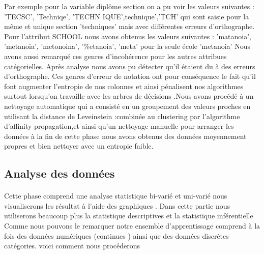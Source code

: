 Par exemple pour la variable diplôme section on a pu voir les valeurs suivantes : 'TECSC', 'Techniqe',
'TECHN IQUE',technique','TCH' qui sont saisie pour la même et unique
section 'techniques' mais avec différentes erreurs d'orthographe. \\
Pour l'attribut SCHOOL nous avons obtenus les valeurs suivantes :
'matanoia', 'metanoia', 'metonoina', '\%etanoia', 'meta' pour la seule école 'metanoia'
Nous avons aussi remarqué ces genres d'incohérence pour les autres attribues catégorielles.  
Après analyse nous avons pu détecter qu'il étaient  du à des erreurs d'orthographe.
Ces genres d'erreur de notation ont pour conséquence le fait qu'il font
augmenter l'entropie de nos colonnes et ainsi pénalisent nos algorithmes
surtout lorsqu'on travaille avec les arbres de décisions .Nous avons
procédé à un nettoyage automatique qui a consisté en un groupement des
valeurs proches en utilisant la distance de Leveinstein :\cite{LevStack}combinée au  clustering par l'algorithme d'affinity propagation,et
ainsi qu'un nettoyage manuelle pour arranger les données à la fin de
cette phase nous avons obtenus des données moyennement propres et bien
nettoyer avec un entropie faible.
 \subsection{Analyse des données}\label{analyse-des-donnuxe9es}
\paragraph{}
Cette phase comprend une analyse statistique bi-varié et uni-varié nous
visualiserons les résultat à l'aide des graphiques . Dans cette partie
nous utiliserons beaucoup plus la statistique descriptives et la statistique inférentielle
Comme nous  pouvons le remarquer notre ensemble d'apprentissage
comprend à la fois des données numériques (continues ) ainsi que des
données discrètes catégories. voici comment nous procéderons 

